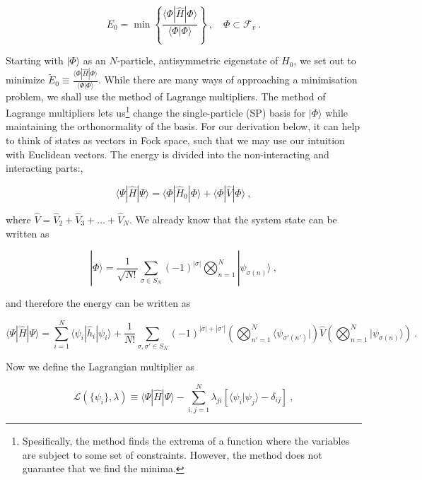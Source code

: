 \documentclass[10pt,twoside]{report}
\begin{document}
	\begin{equation}
		E_0 = \min\left\{\frac{\langle\Phi|\hat{H}|\Phi\rangle}{\langle\Phi|\Phi\rangle}\right\} \:,\quad \Phi \subset \mathcal{F}_v \:.
		\label{MBQM | eq | "Variational principle"}
	\end{equation}
	
	Starting with $|\Phi\rangle$ as an $N$-particle, antisymmetric eigenstate of $H_0$, we set out to minimize $\widetilde{E}_0 \equiv \frac{\langle\Phi|\hat{H}|\Phi\rangle}{\langle\Phi|\Phi\rangle}$. While there are many ways of approaching a minimisation problem, we shall use the method of Lagrange multipliers. The method of Lagrange multipliers lets us\footnote{Spesifically, the method finds the extrema of a function where the variables are subject to some set of constraints. However, the method does not guarantee that we find the minima.} change the single-particle (SP) basis for $|\Phi\rangle$ while maintaining the orthonormality of the basis. For our derivation below, it can help to think of states as vectors in Fock space, such that we may use our intuition with Euclidean vectors. The energy is divided into the non-interacting and interacting parts:,
	
	\begin{equation}
		\langle\Psi|\hat{H}|\Psi\rangle = \langle\Phi|\hat{H}_0|\Phi\rangle + \langle\Phi|\hat{V}|\Phi\rangle\:,
	\end{equation}
	
	\noindent where $\hat{V} = \hat{V}_2 + \hat{V}_3 + \ldots + \hat{V}_N$. We already know that the system state can be written as
	
	\begin{equation}
		|\Phi\rangle = \frac{1}{\sqrt{N!}}\sum_{\sigma\in S_N} (-1)^{|\sigma|}\bigotimes_{n=1}^N |\psi_{\sigma(n)}\rangle \:,
	\end{equation}
	
	\noindent and therefore the energy can be written as
	
	\begin{equation}
		\langle\Psi|\hat{H}|\Psi\rangle = \sum_{i=1}^N\langle\psi_i|\hat{h}_i|\psi_i\rangle + \frac{1}{N!}\sum_{\sigma,\sigma'\in S_N} (-1)^{|\sigma|+|\sigma'|}\left(\bigotimes_{n'=1}^N \langle\psi_{\sigma'(n')}|\right)\hat{V}\left(\bigotimes_{n=1}^N |\psi_{\sigma(n)}\rangle\right)\:.
	\end{equation}
	
	Now we define the Lagrangian multiplier as
	
	\begin{equation}
		\mathcal{L}\left( \{\psi_i\},\lambda \right) \equiv \langle\Psi|\hat{H}|\Psi\rangle - \sum_{i,j=1}^N \lambda_{ji}\left[ \langle\psi_i|\psi_j\rangle - \delta_{ij} \right]\:,
	\end{equation}
	
\end{document}
